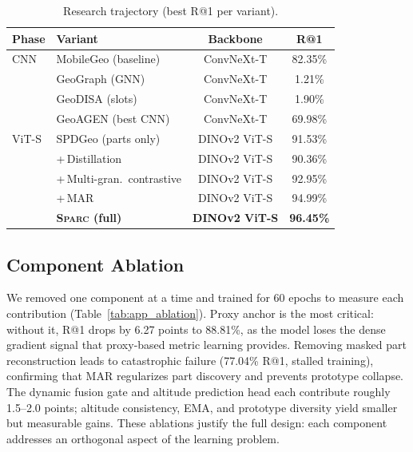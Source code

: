 \documentclass[sigconf, anonymous, review]{acmart}
\newcommand{\ours}{\textsc{Sparc}}
\begin{document}
\begin{table}[h]
\caption{Research trajectory (best R@1 per variant).}
\label{tab:app_journey}
\centering
\small
\begin{tabular}{@{}llcc@{}}
\toprule
\textbf{Phase} & \textbf{Variant} & \textbf{Backbone} & \textbf{R@1} \\
\midrule
CNN & MobileGeo (baseline) & ConvNeXt-T & 82.35\% \\
 & GeoGraph (GNN) & ConvNeXt-T & 1.21\% \\
 & GeoDISA (slots) & ConvNeXt-T & 1.90\% \\
 & GeoAGEN (best CNN) & ConvNeXt-T & 69.98\% \\
\midrule
ViT-S & SPDGeo (parts only) & DINOv2 ViT-S & 91.53\% \\
 & +\,Distillation & DINOv2 ViT-S & 90.36\% \\
 & +\,Multi-gran.\ contrastive & DINOv2 ViT-S & 92.95\% \\
 & +\,MAR & DINOv2 ViT-S & 94.99\% \\
\rowcolor{bestrow}
 & \textbf{\ours{} (full)} & \textbf{DINOv2 ViT-S} & \textbf{96.45\%} \\
\bottomrule
\end{tabular}
\end{table}

\subsection*{Component Ablation}

We removed one component at a time and trained for 60 epochs to measure each contribution (Table~\ref{tab:app_ablation}).
Proxy anchor is the most critical: without it, R@1 drops by 6.27 points to 88.81\%, as the model loses the dense gradient signal that proxy-based metric learning provides.
Removing masked part reconstruction leads to catastrophic failure (77.04\% R@1, stalled training), confirming that MAR regularizes part discovery and prevents prototype collapse.
The dynamic fusion gate and altitude prediction head each contribute roughly 1.5--2.0 points; altitude consistency, EMA, and prototype diversity yield smaller but measurable gains.
These ablations justify the full design: each component addresses an orthogonal aspect of the learning problem.
\end{document}
